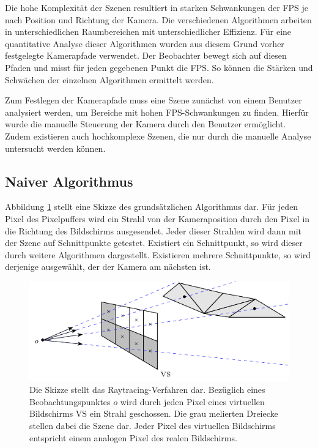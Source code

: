 \documentclass[crop=false]{standalone}
\begin{document}
        Die hohe Komplexität der Szenen resultiert in starken Schwankungen der FPS je nach Position und Richtung der Kamera.
        Die verschiedenen Algorithmen arbeiten in unterschiedlichen Raumbereichen mit unterschiedlicher Effizienz.
        Für eine quantitative Analyse dieser Algorithmen wurden aus diesem Grund vorher festgelegte Kamerapfade verwendet.
        Der Beobachter bewegt sich auf diesen Pfaden und misst für jeden gegebenen Punkt die FPS.
        So können die Stärken und Schwächen der einzelnen Algorithmen ermittelt werden.

        Zum Festlegen der Kamerapfade muss eine Szene zunächst von einem Benutzer analysiert werden, um Bereiche mit hohen FPS-Schwankungen zu finden.
        Hierfür wurde die manuelle Steuerung der Kamera durch den Benutzer ermöglicht.
        Zudem existieren auch hochkomplexe Szenen, die nur durch die manuelle Analyse untersucht werden können.

    \subsection{Naiver Algorithmus} %
    \label{sub:naiver_algorithmus}
      Abbildung \ref{fig:raytracing} stellt eine Skizze des grundsätzlichen Algorithmus dar.
      Für jeden Pixel des Pixelpuffers wird ein Strahl von der Kameraposition durch den Pixel in die Richtung des Bildschirms ausgesendet.
      Jeder dieser Strahlen wird dann mit der Szene auf Schnittpunkte getestet.
      Existiert ein Schnittpunkt, so wird dieser durch weitere Algorithmen dargestellt.
      Existieren mehrere Schnittpunkte, so wird derjenige ausgewählt, der der Kamera am nächsten ist.
      \begin{figure}
        \center
        \includegraphics{images/ray_tracing_scheme.pdf}
        \caption{%
          Die Skizze stellt das Raytracing-Verfahren dar.
          Bezüglich eines Beobachtungspunktes $o$ wird durch jeden Pixel eines virtuellen Bildschirms $\mathrm{VS}$ ein Strahl geschossen.
          Die grau melierten Dreiecke stellen dabei die Szene dar.
          Jeder Pixel des virtuellen Bildschirms entspricht einem analogen Pixel des realen Bildschirms.
        }
        \label{fig:raytracing}
      \end{figure}
\end{document}

